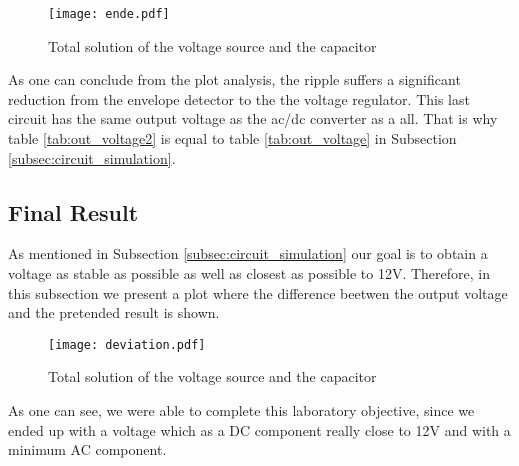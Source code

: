 \begin{figure}[H] \centering
\texttt{[image: ende.pdf]}
\caption{Total solution of the voltage source and the capacitor}
\label{fig:env+vore}
\end{figure}


As one can conclude from the plot analysis, the ripple suffers a significant reduction from the envelope detector to the the voltage regulator. This last circuit has the same output voltage as the ac/dc converter as a all. That is why table \ref{tab:out_voltage2} is equal to table \ref{tab:out_voltage} in Subsection \ref{subsec:circuit_simulation}.



\subsection{Final Result}

\par As mentioned in Subsection \ref{subsec:circuit_simulation} our goal is to obtain a voltage as stable as possible as well as closest as possible to 12V. Therefore, in this subsection we present a plot where the difference beetwen the output voltage and the pretended result is shown.

\begin{figure}[H] \centering
\texttt{[image: deviation.pdf]}
\caption{Total solution of the voltage source and the capacitor}
\label{fig:vo-12}
\end{figure}


As one can see, we were able to complete this laboratory objective, since we ended up with a voltage which as a DC component really close to 12V and with a minimum AC component.


